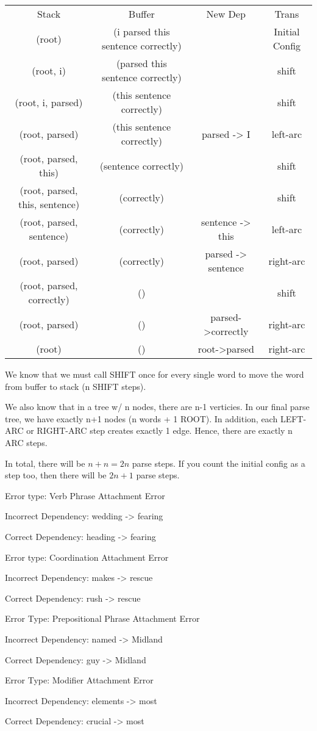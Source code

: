 \documentclass[11pt,largemargins]{homework}
\begin{document}
\begin{center}
\begin{tabular}{ |c|c|c|c| }
 \hline
   Stack & Buffer & New Dep & Trans \\
   (root) & (i parsed this sentence correctly) &  & Initial Config \\
   (root, i) & (parsed this sentence correctly) &  & shift \\
   (root, i, parsed) & (this sentence correctly) &  & shift \\
   (root, parsed) & (this sentence correctly) & parsed -> I & left-arc \\
   (root, parsed, this) & (sentence correctly) &  & shift \\
   (root, parsed, this, sentence) & (correctly) &  & shift \\
   (root, parsed, sentence) & (correctly) & sentence -> this & left-arc \\
   (root, parsed) & (correctly) & parsed -> sentence  & right-arc \\
   (root, parsed, correctly) & () &  & shift \\
   (root, parsed) & () & parsed->correctly  & right-arc \\
   (root) & () & root->parsed  & right-arc \\
 \hline
\end{tabular}
\end{center}

\question

We know that we must call SHIFT once for every single word to move the word from buffer to stack (n SHIFT steps).

We also know that in a tree w/ n nodes, there are n-1 verticies. In our final parse tree, we have exactly n+1 nodes (n words + 1 ROOT). In addition, each LEFT-ARC or RIGHT-ARC step creates exactly 1 edge. Hence, there are exactly n ARC steps. 

In total, there will be $n + n = 2n$ parse steps. If you count the initial config as a step too, then there will be $2n+1$ parse steps. 



\question
Error type: Verb Phrase Attachment Error

Incorrect Dependency: wedding -> fearing

Correct Dependency: heading -> fearing 


\question
Error type: Coordination Attachment Error

Incorrect Dependency: makes -> rescue

Correct Dependency: rush -> rescue 


\question

Error Type: Prepositional Phrase Attachment Error 

Incorrect Dependency: named -> Midland

Correct Dependency: guy -> Midland 


\question 

Error Type: Modifier Attachment Error 

Incorrect Dependency: elements -> most

Correct Dependency: crucial -> most
\end{document}
